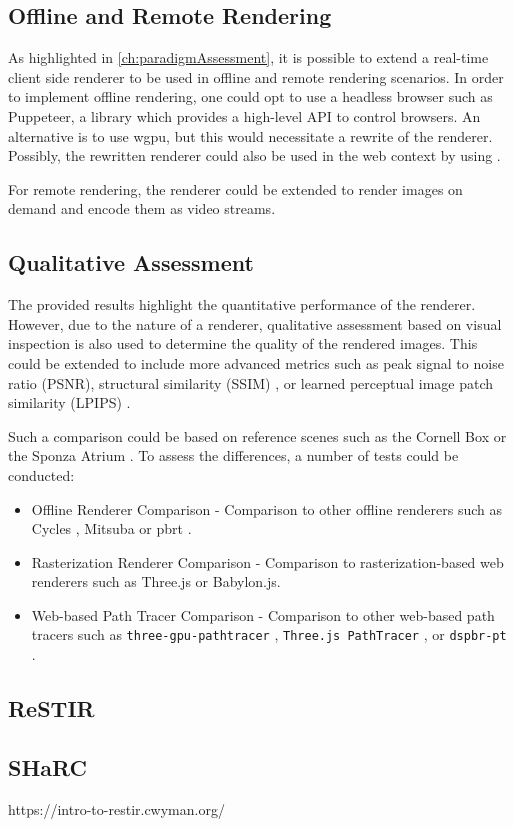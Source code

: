 \subsection{Offline and Remote Rendering}

As highlighted in \autoref{ch:paradigmAssessment}, it is possible to extend a real-time client side renderer to be used in offline and remote rendering scenarios. In order to implement offline rendering, one could opt to use a headless browser such as Puppeteer, a  library which provides a high-level \gls{API} to control browsers. An alternative is to use \gls{wgpu}, but this would necessitate a rewrite of the renderer. Possibly, the rewritten renderer could also be used in the web context by using .

For remote rendering, the renderer could be extended to render images on demand and encode them as video streams.

\subsection{Qualitative Assessment}

The provided results highlight the quantitative performance of the renderer. However, due to the nature of a renderer, qualitative assessment based on visual inspection is also used to determine the quality of the rendered images. This could be extended to include more advanced metrics such as peak signal to noise ratio (PSNR), structural similarity (SSIM) \cite{ssim}, or learned perceptual image patch similarity (LPIPS) \cite{lpips}.

Such a comparison could be based on reference scenes such as the Cornell Box \cite{goral1984modeling} or the Sponza Atrium \cite{dabrovic2002sponza}. To assess the differences, a number of tests could be conducted:

\begin{itemize}
    \item{Offline Renderer Comparison} - Comparison to other offline renderers such as Cycles \cite{cycles}, Mitsuba \cite{Jakob2020DrJit} or \gls{pbrt} \cite{Pharr_Physically_Based_Rendering_2023}.
    \item{Rasterization Renderer Comparison} - Comparison to rasterization-based web renderers such as \gls{Three.js} or \gls{Babylon.js}.
    \item{Web-based Path Tracer Comparison} - Comparison to other web-based path tracers such as \texttt{three-gpu-pathtracer} \cite{ThreeJsPathTracerJohnson}, \texttt{Three.js PathTracer} \cite{ThreeJsPathTracerLoftis}, or \texttt{dspbr-pt} \cite{PathTracerDassault}.
\end{itemize}


\subsection{ReSTIR}
\subsection{SHaRC}

https://intro-to-restir.cwyman.org/